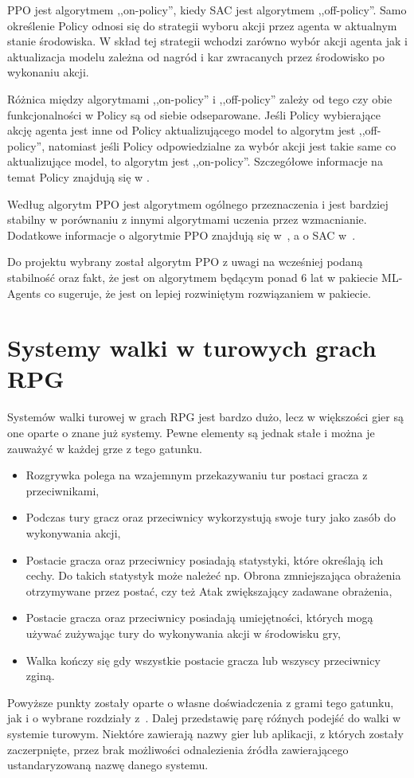 \documentclass{SGGW-thesis}
\begin{document}
PPO jest algorytmem ,,on-policy'', kiedy SAC jest algorytmem ,,off-policy''. 
Samo określenie Policy odnosi się do strategii wyboru akcji przez agenta w aktualnym stanie środowiska. 
W skład tej strategii wchodzi zarówno wybór akcji agenta jak i aktualizacja modelu zależna od nagród i kar zwracanych przez środowisko po wykonaniu akcji.

Różnica między algorytmami ,,on-policy'' i ,,off-policy'' zależy od tego czy obie funkcjonalności w Policy są od siebie odseparowane. 
Jeśli Policy wybierające akcję agenta jest inne od Policy aktualizującego model to algorytm jest ,,off-policy'', 
natomiast jeśli Policy odpowiedzialne za wybór akcji jest takie same co aktualizujące model, to algorytm jest ,,on-policy''. 
Szczegółowe informacje na temat Policy znajdują się w \cite{RLBook}.

Według \cite{MLAgentsDocs} algorytm PPO jest algorytmem ogólnego przeznaczenia i jest bardziej stabilny w porównaniu z innymi algorytmami uczenia przez wzmacnianie.
Dodatkowe informacje o algorytmie PPO znajdują się w~\cite{PPOArticle}, a o SAC w~\cite{SACArticle}. 


Do projektu wybrany został algorytm PPO z uwagi na wcześniej podaną stabilność oraz fakt, że jest on algorytmem będącym ponad 6 lat w pakiecie ML-Agents co sugeruje, że jest on lepiej rozwiniętym rozwiązaniem w pakiecie.

\section{Systemy walki w turowych grach RPG}
Systemów walki turowej w grach RPG jest bardzo dużo, lecz w większości gier są one oparte o znane już systemy. Pewne elementy są jednak stałe i można je zauważyć w każdej grze z tego gatunku.
\begin{itemize}
  \item{Rozgrywka polega na wzajemnym przekazywaniu tur postaci gracza z przeciwnikami},
  \item{Podczas tury gracz oraz przeciwnicy wykorzystują swoje tury jako zasób do wykonywania akcji},
  \item{Postacie gracza oraz przeciwnicy posiadają statystyki, które określają ich cechy. Do takich statystyk może należeć np. Obrona zmniejszająca obrażenia otrzymywane przez postać, czy też Atak zwiększający zadawane obrażenia},
  \item{Postacie gracza oraz przeciwnicy posiadają umiejętności, których mogą używać zużywając tury do wykonywania akcji w środowisku gry},
  \item{Walka kończy się gdy wszystkie postacie gracza lub wszyscy przeciwnicy zginą}.
\end{itemize}
Powyższe punkty zostały oparte o własne doświadczenia z grami tego gatunku, jak i o wybrane rozdziały z~\cite{RLLearningInTBRPG, PlayerPreferencesInRPGs}. Dalej przedstawię parę róźnych podejść do walki w systemie turowym. 
Niektóre zawierają nazwy gier lub aplikacji, z których zostały zaczerpnięte, przez brak możliwości odnalezienia źródła zawierającego ustandaryzowaną nazwę danego systemu.
\end{document}
